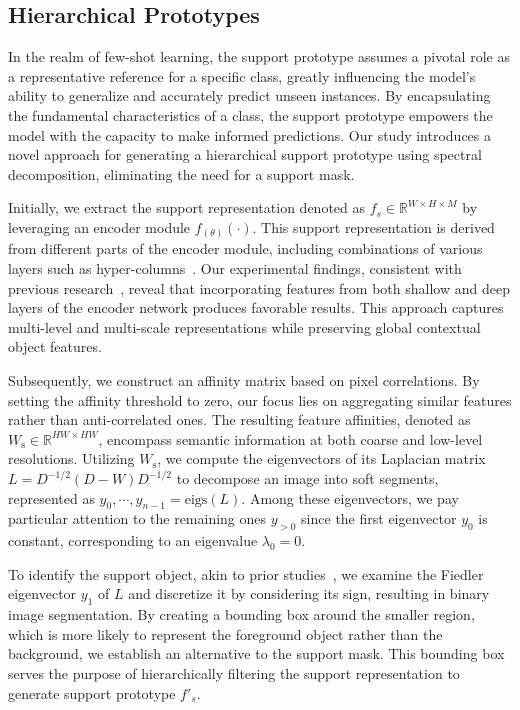 \documentclass[runningheads]{llncs}
\begin{document}
\subsection{Hierarchical Prototypes}
In the realm of few-shot learning, the support prototype assumes a pivotal role as a representative reference for a specific class, greatly influencing the model's ability to generalize and accurately predict unseen instances. By encapsulating the fundamental characteristics of a class, the support prototype empowers the model with the capacity to make informed predictions. Our study introduces a novel approach for generating a hierarchical support prototype using spectral decomposition, eliminating the need for a support mask.

Initially, we extract the support representation denoted as $f_s \in \mathbb{R}^{W \times H \times M}$ by leveraging an encoder module $f_{(\theta)}(\cdot)$. This support representation is derived from different parts of the encoder module, including combinations of various layers such as hyper-columns~\cite{hariharan2015hypercolumns}. Our experimental findings, consistent with previous research~\cite{azad2021texture}, reveal that incorporating features from both shallow and deep layers of the encoder network produces favorable results. This approach captures multi-level and multi-scale representations while preserving global contextual object features.

Subsequently, we construct an affinity matrix based on pixel correlations. By setting the affinity threshold to zero, our focus lies on aggregating similar features rather than anti-correlated ones. The resulting feature affinities, denoted as $W_\mathrm{s} \in \mathbb{R}^{HW \times HW}$, encompass semantic information at both coarse and low-level resolutions.
Utilizing $W_\mathrm{s}$, we compute the eigenvectors of its Laplacian matrix $L = D^{-1/2}(D - W)D^{-1/2}$ to decompose an image into soft segments, represented as ${y_0, \cdots, y_{n-1}} = \mathrm{eigs}(L)$. Among these eigenvectors, we pay particular attention to the remaining ones $y_{>0}$ since the first eigenvector $y_0$ is constant, corresponding to an eigenvalue $\lambda_0 = 0$.

To identify the support object, akin to prior studies~\cite{melas2022deep}, we examine the Fiedler eigenvector $y_1$ of $L$ and discretize it by considering its sign, resulting in binary image segmentation. By creating a bounding box around the smaller region, which is more likely to represent the foreground object rather than the background, we establish an alternative to the support mask. This bounding box serves the purpose of hierarchically filtering the support representation to generate support prototype $f'_s$.
\end{document}
